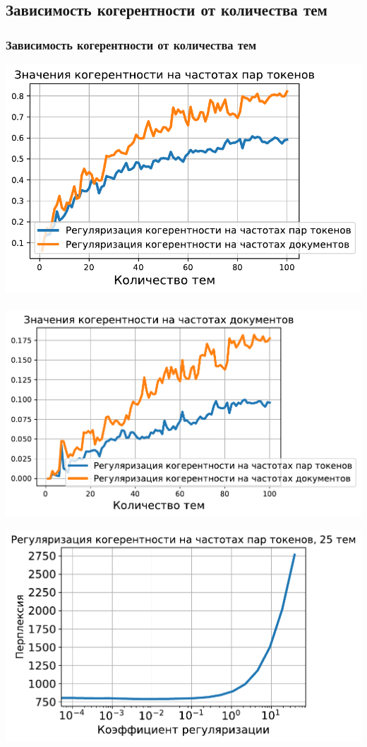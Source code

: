 \documentclass[unicode]{beamer}
\begin{document}
\subsection{Зависимость когерентности от количества тем}
\begin{frame}
\frametitle{Зависимость когерентности от количества тем}
\begin{center}
    \includegraphics[scale=0.30]{coherence_tf_reg_tf_df_score_with_different_num_of_topics.pdf} \,\,\,\,\,
    \includegraphics[scale=0.30]{coherence_df_reg_tf_df_score_with_different_num_of_topics.pdf}
\end{center}
\begin{center}
    \includegraphics[scale=0.30]{perplexity_coherence_tf_reg_25_topics.pdf}

\end{center}
\end{frame}
\end{document}
